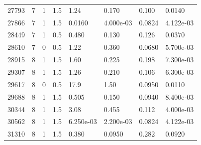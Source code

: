 \documentclass[preview]{standalone}
\begin{document}
{{{\begin{tabular}{L{1.2cm}C{1.2cm} C{0.3cm}C{0.5cm} C{1.4cm}C{1.4cm} C{1.4cm}C{1.4cm}}
  27793  &     7  & 1     & 1.5 &  1.24  & 0.170  & 0.100 &  0.0140   \\ 
  27866  &     7  & 1     & 1.5 &  0.0160  & 4.000e-03  & 0.0824 &  4.122e-03   \\ 
  28449  &     7  & 1     & 0.5 &  0.480  & 0.130  & 0.126 &  0.0370   \\ 
  28610  &     7  & 0     & 0.5 &  1.22  & 0.360  & 0.0680 &  5.700e-03   \\ 
  28915  &     8  & 1     & 1.5 &  1.60  & 0.225  & 0.198 &  7.300e-03   \\ 
  29307  &     8  & 1     & 1.5 &  1.26  & 0.210  & 0.106 &  6.300e-03   \\ 
  29617  &     8  & 0     & 0.5 &  17.9  & 1.50  & 0.0950 &  0.0110   \\ 
  29688  &     8  & 1     & 1.5 &  0.505  & 0.150  & 0.0940 &  8.400e-03   \\ 
  30344  &     8  & 1     & 1.5 &  3.08  & 0.455  & 0.112 &  4.000e-03   \\ 
  30562  &     8  & 1     & 1.5 &  6.250e-03  & 2.200e-03  & 0.0824 &  4.122e-03   \\ 
  31310  &     8  & 1     & 1.5 &  0.380  & 0.0950  & 0.282 &  0.0920   \\ 
\hline 
\end{tabular} 

}}}
\end{document}
